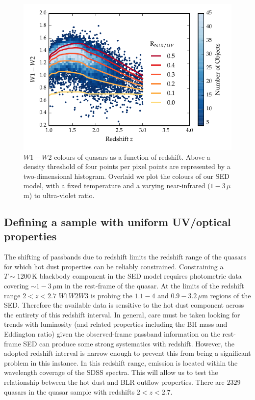 \begin{figure}[t!]
\centering
\includegraphics[width=\columnwidth]{figures/chapter05/w1w2_versus_redshift_ratio.pdf}
\caption[{$W1 - W2$ colours of sample as a function of redshift.}]{$W1 - W2$ colours of quasars as a function of redshift. Above a density threshold of four points per pixel points are represented by a two-dimensional histogram. Overlaid we plot the colours of our SED model, with a fixed temperature and a varying near-infrared ($1 - 3$\,$\mu$m) to ultra-violet ratio.}
  \label{fig:w1w2colorsratio}
\end{figure}

\subsection{Defining a sample with uniform UV/optical properties}
\label{sec:ch5-hotdustsample}

The shifting of passbands due to redshift limits the redshift range of the quasars for which hot dust properties can be reliably constrained.
Constraining a $T\sim1200$\,K blackbody component in the SED model requires photometric data covering $\sim1-3$\,$\mu$m in the rest-frame of the quasar. 
At the limits of the redshift range $2 < z < 2.7$ $W1W2W3$ is probing the $1.1-4$ and $0.9-3.2$\,$\mu$m regions of the SED. 
Therefore the available data is sensitive to the hot dust component across the entirety of this redshift interval. 
In general, care must be taken looking for trends with luminosity (and related properties including the BH mass and Eddington ratio) given the observed-frame passband information on the rest-frame SED can produce some strong systematics with redshift.
However, the adopted redshift interval is narrow enough to prevent this from being a significant problem in this instance. 
In this redshift range,  emission is located within the wavelength coverage of the SDSS spectra.
This will allow us to test the relationship between the hot dust and BLR outflow properties. 
There are $2329$ quasars in the quasar sample with redshifts $2 < z < 2.7$. 


